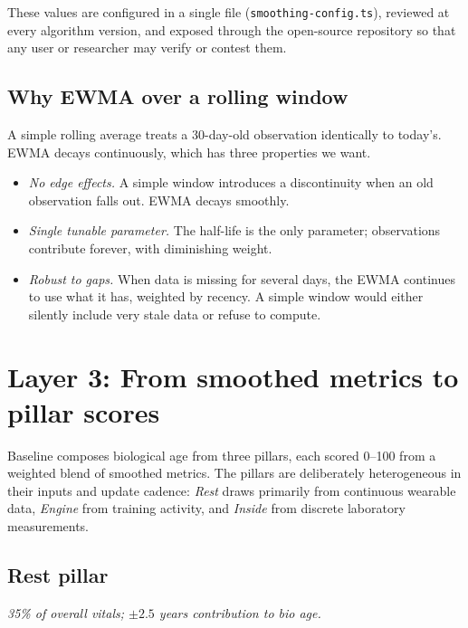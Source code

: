 \documentclass[10pt, a4paper]{article}
\begin{document}
These values are configured in a single file (\texttt{smoothing-config.ts}), reviewed at every algorithm version, and exposed through the open-source repository so that any user or researcher may verify or contest them.

\subsection{Why EWMA over a rolling window}

A simple rolling average treats a 30-day-old observation identically to today's. EWMA decays continuously, which has three properties we want.

\begin{itemize}
  \item \textit{No edge effects.} A simple window introduces a discontinuity when an old observation falls out. EWMA decays smoothly.
  \item \textit{Single tunable parameter.} The half-life is the only parameter; observations contribute forever, with diminishing weight.
  \item \textit{Robust to gaps.} When data is missing for several days, the EWMA continues to use what it has, weighted by recency. A simple window would either silently include very stale data or refuse to compute.
\end{itemize}

\section{Layer 3: From smoothed metrics to pillar scores}

Baseline composes biological age from three pillars, each scored 0--100 from a weighted blend of smoothed metrics. The pillars are deliberately heterogeneous in their inputs and update cadence: \textit{Rest} draws primarily from continuous wearable data, \textit{Engine} from training activity, and \textit{Inside} from discrete laboratory measurements.

\subsection{Rest pillar}
\textit{35\% of overall vitals; $\pm 2.5$ years contribution to bio age.}
\end{document}
